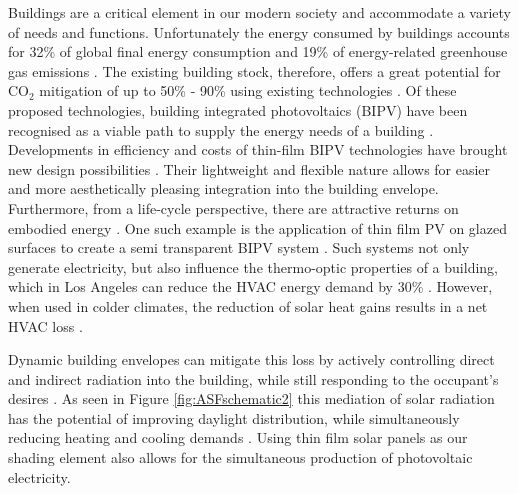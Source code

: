 

Buildings are a critical element in our modern society and accommodate a variety of needs and functions. Unfortunately the energy consumed by buildings accounts for 32\% of global final energy consumption and 19\% of energy-related greenhouse gas emissions \cite{IPCC}. The existing building stock, therefore, offers a great potential for CO$_2$ mitigation of up to 50\% - 90\% using existing technologies \cite{IPCC}. Of these proposed technologies, building integrated photovoltaics (BIPV) have been recognised as a viable path to supply the energy needs of a building \cite{defaix2012technical,raugei2009life}. \\



Developments in efficiency and costs of thin-film BIPV technologies have brought new design possibilities \cite{NREL, kushiya2014cis, kaelin2004low,jelle2012building}. Their lightweight and flexible nature allows for easier and more aesthetically pleasing integration into the building envelope. Furthermore, from a life-cycle perspective, there are attractive returns on embodied energy \cite{perez2012faccade,jayathissa2016life}. One such example is the application of thin film PV on glazed surfaces to create a semi transparent BIPV system \cite{li2009energy,peng2016numerical,vats2012energy}. Such systems not only generate electricity, but also influence the thermo-optic properties of a building, which in Los Angeles can reduce the HVAC energy demand by 30\% \cite{chae2014building}. However, when used in colder climates, the reduction of solar heat gains results in a net HVAC loss \cite{chae2014building}.

Dynamic building envelopes can mitigate this loss by actively controlling direct and indirect radiation into the building, while still responding to the occupant's desires \cite{loonen2013climate}. As seen in Figure \ref{fig:ASFschematic2} this mediation of solar radiation has the potential of improving daylight distribution, while simultaneously reducing heating and cooling demands \cite{nagy2016adaptive}. Using thin film solar panels as our shading element also allows for the simultaneous production of photovoltaic electricity. \\


